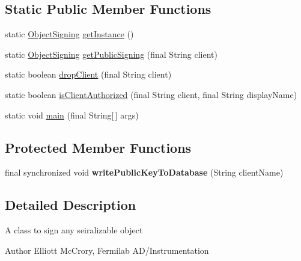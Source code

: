 \subsection*{Static Public Member Functions}
\begin{DoxyCompactItemize}
\item 
static \hyperlink{classgov_1_1fnal_1_1ppd_1_1dd_1_1util_1_1ObjectSigning}{Object\-Signing} \hyperlink{classgov_1_1fnal_1_1ppd_1_1dd_1_1util_1_1ObjectSigning_a26bfbdba5d8c5f16fdcba60f08b19218}{get\-Instance} ()
\item 
static \hyperlink{classgov_1_1fnal_1_1ppd_1_1dd_1_1util_1_1ObjectSigning}{Object\-Signing} \hyperlink{classgov_1_1fnal_1_1ppd_1_1dd_1_1util_1_1ObjectSigning_a376a60ae008f77db2a3745096fcce056}{get\-Public\-Signing} (final String client)
\item 
static boolean \hyperlink{classgov_1_1fnal_1_1ppd_1_1dd_1_1util_1_1ObjectSigning_a962a6915fbfc713489d4e0c21e01aad5}{drop\-Client} (final String client)
\item 
static boolean \hyperlink{classgov_1_1fnal_1_1ppd_1_1dd_1_1util_1_1ObjectSigning_aa8c327ae8cdd7a6c8bce3926e753a951}{is\-Client\-Authorized} (final String client, final String display\-Name)
\item 
static void \hyperlink{classgov_1_1fnal_1_1ppd_1_1dd_1_1util_1_1ObjectSigning_a12b58708e26957e8f63ea134500b4764}{main} (final String\mbox{[}$\,$\mbox{]} args)
\end{DoxyCompactItemize}
\subsection*{Protected Member Functions}
\begin{DoxyCompactItemize}
\item 
\hypertarget{classgov_1_1fnal_1_1ppd_1_1dd_1_1util_1_1ObjectSigning_a6f4e04a43a9f46432df4a6d08d8702d1}{final synchronized void {\bfseries write\-Public\-Key\-To\-Database} (String client\-Name)}\label{classgov_1_1fnal_1_1ppd_1_1dd_1_1util_1_1ObjectSigning_a6f4e04a43a9f46432df4a6d08d8702d1}

\end{DoxyCompactItemize}


\subsection{Detailed Description}
A class to sign any seiralizable object 

\begin{DoxyAuthor}{Author}
Elliott Mc\-Crory, Fermilab A\-D/\-Instrumentation 
\end{DoxyAuthor}


